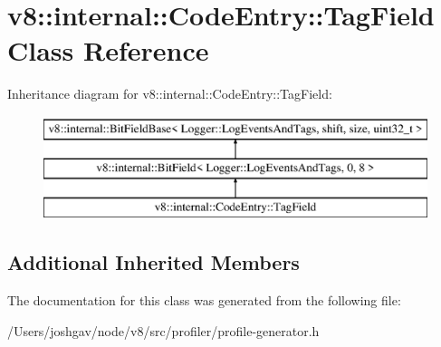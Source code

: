 \hypertarget{classv8_1_1internal_1_1_code_entry_1_1_tag_field}{}\section{v8\+:\+:internal\+:\+:Code\+Entry\+:\+:Tag\+Field Class Reference}
\label{classv8_1_1internal_1_1_code_entry_1_1_tag_field}
Inheritance diagram for v8\+:\+:internal\+:\+:Code\+Entry\+:\+:Tag\+Field\+:\begin{figure}[H]
\begin{center}
\leavevmode
\includegraphics[height=3.000000cm]{classv8_1_1internal_1_1_code_entry_1_1_tag_field}
\end{center}
\end{figure}
\subsection*{Additional Inherited Members}


The documentation for this class was generated from the following file\+:\begin{DoxyCompactItemize}
\item 
/\+Users/joshgav/node/v8/src/profiler/profile-\/generator.\+h\end{DoxyCompactItemize}
